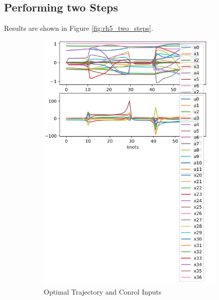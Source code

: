 \subsection{Performing two Steps}
Results are shown in Figure \ref{fig:rh5_two_steps}.
\begin{figure}[h!]
\centering
\begin{subfigure}{.4\textwidth}
  \centering
  \includegraphics[width=1\linewidth]{Media/Crocoddyl/RH5Legs/2Steps/RH52Steps_Solution.png}
  \caption{Optimal Trajectory and Conrol Inputs}
\end{subfigure}%
\begin{subfigure}{.4\textwidth}
  \centering

\end{subfigure}
\end{figure}
